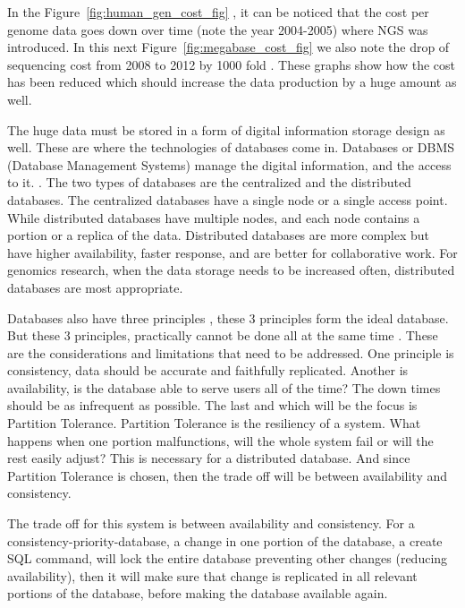 \documentclass[acmsmall]{acmart}
\begin{document}
\begin{multicols}{2}
In the Figure~\ref{fig:human_gen_cost_fig} \cite{genomics-cost}, it can be noticed that the cost per genome data goes down over time (note the year 2004-2005) where NGS was introduced. In this next Figure~\ref{fig:megabase_cost_fig}\cite{genomics-cost} we also note the drop of sequencing cost from 2008 to 2012 by 1000 fold \cite{bon_compression}. These graphs show how the cost has been reduced which should increase the data production by a huge amount as well.

The huge data must be stored in a form of digital information storage design as well. These are where the technologies of databases come in. Databases or DBMS (Database Management Systems) manage the digital information, and the access to it. \cite{Silberschatz2010}. The two types of databases are the centralized and the distributed databases\cite{centralizedvsdistributed}. The centralized databases have a single node or a single access point. While distributed databases have multiple nodes, and each node contains a portion or a replica of the data. Distributed databases are more complex but have higher availability, faster response, and are better for collaborative work. For genomics research, when the data storage needs to be increased often, distributed databases are most appropriate.

Databases also have three principles \cite{Silberschatz2010}, these 3 principles form the ideal database. But these 3 principles, practically cannot be done all at the same time \cite{Silberschatz2010}. These are the considerations and limitations that need to be addressed. One principle is consistency, data should be accurate and faithfully replicated. Another is availability, is the database able to serve users all of the time? The down times should be as infrequent as possible. The last and which will be the focus is Partition Tolerance. Partition Tolerance is the resiliency of a system. What happens when one portion malfunctions, will the whole system fail or will the rest easily adjust? This is necessary for a distributed database. And since Partition Tolerance \cite{Silberschatz2010} is chosen, then the trade off will be between availability and consistency.

The trade off for this system is between availability and consistency. For a consistency-priority-database, a change in one portion of the database, a create SQL command, will lock the entire database preventing other changes (reducing availability), then it will make sure that change is replicated in all relevant portions of the database, before making the database available again.


\end{multicols}
\end{document}
